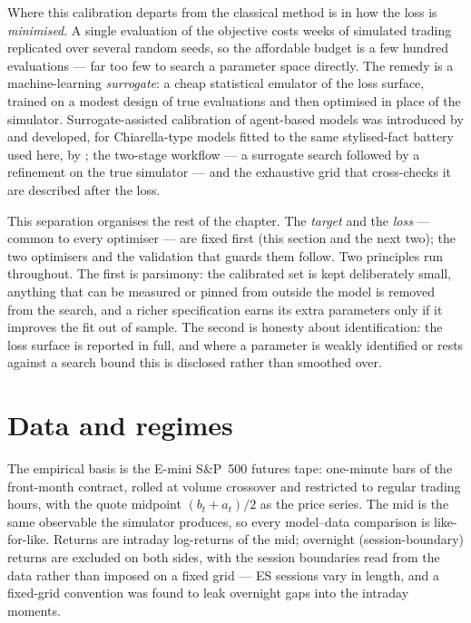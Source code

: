 Where this calibration departs from the classical method is in how the loss is
\emph{minimised}. A single evaluation of the objective costs weeks of simulated
trading replicated over several random seeds, so the affordable budget is a few
hundred evaluations --- far too few to search a parameter space directly. The
remedy is a machine-learning \emph{surrogate}: a cheap statistical emulator of
the loss surface, trained on a modest design of true evaluations and then
optimised in place of the simulator. Surrogate-assisted calibration of
agent-based models was introduced by \citet{lamperti_2018} and developed, for
Chiarella-type models fitted to the same stylised-fact battery used here, by
\citet{gao_2022_xgb,gao_2022_hfabm}; the two-stage workflow --- a surrogate
search followed by a refinement on the true simulator --- and the exhaustive
grid that cross-checks it \citep{gao_2023} are described after the loss.

This separation organises the rest of the chapter. The \emph{target} and the
\emph{loss} --- common to every optimiser --- are fixed first (this section and
the next two); the two optimisers and the validation that guards them follow.
Two principles run throughout. The first is parsimony: the calibrated set is
kept deliberately small, anything that can be measured or pinned from outside
the model is removed from the search, and a richer specification earns its extra
parameters only if it improves the fit out of sample. The second is honesty
about identification: the loss surface is reported in full, and where a parameter
is weakly identified or rests against a search bound this is disclosed rather
than smoothed over.



\section{Data and regimes}
\label{sec:cal-data}

The empirical basis is the E-mini S\&P~500 futures tape: one-minute bars of the
front-month contract, rolled at volume crossover and restricted to regular
trading hours, with the quote midpoint $(b_t + a_t)/2$ as the price series. The
mid is the same observable the simulator produces, so every model--data
comparison is like-for-like. Returns are intraday log-returns of the mid;
overnight (session-boundary) returns are excluded on both sides, with the
session boundaries read from the data rather than imposed on a fixed grid ---
ES sessions vary in length, and a fixed-grid convention was found to leak
overnight gaps into the intraday moments.

